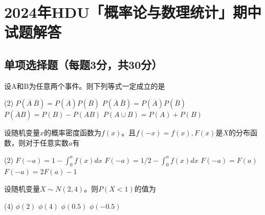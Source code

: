 \documentclass[
    newtxsf,
    twoside,openany,
]{litesolution}
\begin{document}
\chapter*{2024年\textsf{HDU}「概率论与数理统计」期中试题解答}

\section{单项选择题（每题3分，共30分）}

\begin{problem}
    设A和B为任意两个事件。则下列等式一定成立的是
    \begin{tasks}(2)
        \task $P(\overline A\ \overline B)=P(\overline A)P(\overline B)$
        \task $P(\overline A\ \overline B) = P(\overline A) P(\overline B)$
        \task $P(\overline AB)=P(B)-P(AB)$
        \task $P(A\cup B) = P(A) + P(B)$
    \end{tasks}
\end{problem}
\begin{solution}

\end{solution}

\begin{problem}
    设随机变量$x$的概率密度函数为$f(x)$。且$f(-x)=f(x),F(x)$是$X$的分布函数，则对于任意实数$a$有
    \begin{tasks}(2)
        \task$F(-a)=1-\int_{0}^{a}f(x)dx$
        \task$F(-a)=1/2-\int_{0}^{a}f(x)dx$
        \task$F(-a)=F(a)$
        \task$F(-a)=2F(a)-1$
    \end{tasks}
\end{problem}
\begin{solution}

\end{solution}

\begin{problem}
    设随机变量$X\sim N(2,4)$。则$P(X<1)$的值为
    \begin{tasks}(4)
        \task$\phi(2)$
        \task$\phi(4)$
        \task$\phi(0.5)$
        \task$\phi(-0.5)$
    \end{tasks}
\end{problem}
\begin{solution}

\end{solution}
\end{document}
